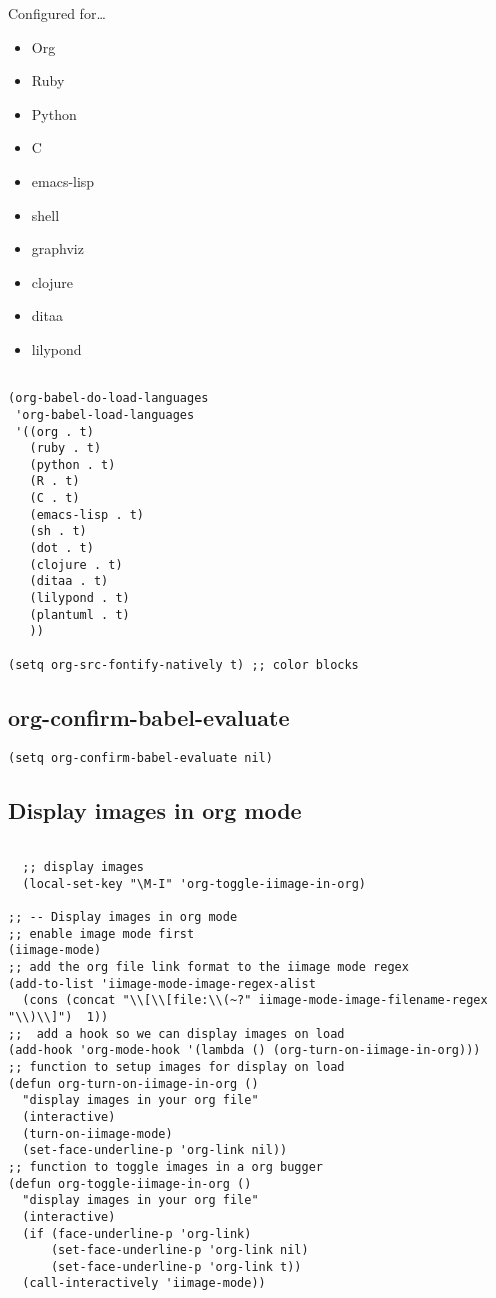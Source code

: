 \documentclass[colorlinks=true,urlcolor=blue,listings-sv]{article}
\begin{document}
Configured for\ldots{}
\begin{itemize}
\item Org
\item Ruby
\item Python
\item C
\item emacs-lisp
\item shell
\item graphviz
\item clojure
\item ditaa
\item lilypond
\end{itemize}


\lstset{language=Lisp}
\begin{lstlisting}

(org-babel-do-load-languages
 'org-babel-load-languages
 '((org . t)
   (ruby . t)
   (python . t)
   (R . t)
   (C . t)
   (emacs-lisp . t)
   (sh . t)
   (dot . t)
   (clojure . t)
   (ditaa . t)
   (lilypond . t)
   (plantuml . t)
   ))

(setq org-src-fontify-natively t) ;; color blocks
\end{lstlisting}
\subsection{org-confirm-babel-evaluate}
\label{sec-1-33}


\lstset{language=Lisp}
\begin{lstlisting}
(setq org-confirm-babel-evaluate nil)
\end{lstlisting}
\subsection{Display images in org mode}
\label{sec-1-34}



\lstset{language=Lisp}
\begin{lstlisting}

  ;; display images
  (local-set-key "\M-I" 'org-toggle-iimage-in-org)

;; -- Display images in org mode
;; enable image mode first
(iimage-mode)
;; add the org file link format to the iimage mode regex
(add-to-list 'iimage-mode-image-regex-alist
  (cons (concat "\\[\\[file:\\(~?" iimage-mode-image-filename-regex "\\)\\]")  1))
;;  add a hook so we can display images on load
(add-hook 'org-mode-hook '(lambda () (org-turn-on-iimage-in-org)))
;; function to setup images for display on load
(defun org-turn-on-iimage-in-org ()
  "display images in your org file"
  (interactive)
  (turn-on-iimage-mode)
  (set-face-underline-p 'org-link nil))
;; function to toggle images in a org bugger
(defun org-toggle-iimage-in-org ()
  "display images in your org file"
  (interactive)
  (if (face-underline-p 'org-link)
      (set-face-underline-p 'org-link nil)
      (set-face-underline-p 'org-link t))
  (call-interactively 'iimage-mode))
\end{lstlisting}
\end{document}
